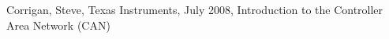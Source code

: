 \begin{thebibliography}{11} %
			Corrigan, Steve, Texas Instruments, July 2008, Introduction to the Controller Area Network (CAN)
%
\end{thebibliography}